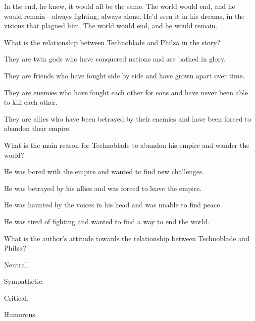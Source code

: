 \documentclass{exam-zh}
\begin{document}
In the end, he knew, it would all be the same. The world would end, and he would remain—always fighting, always alone. He'd seen it in his dreams, in the visions that plagued him. The world would end, and he would remain.

\begin{question}
  What is the relationship between Technoblade and Philza in the story?
  \begin{choices}
  \item They are twin gods who have conquered nations and are bathed in glory.
  \item They are friends who have fought side by side and have grown apart over time.
  \item They are enemies who have fought each other for eons and have never been able to kill each other.
  \item They are allies who have been betrayed by their enemies and have been forced to abandon their empire.
  \end{choices}
\end{question}

\begin{question}
  What is the main reason for Technoblade to abandon his empire and wander the world?
  \begin{choices}
  \item He was bored with the empire and wanted to find new challenges.
  \item He was betrayed by his allies and was forced to leave the empire.
  \item He was haunted by the voices in his head and was unable to find peace.
  \item He was tired of fighting and wanted to find a way to end the world.
  \end{choices}
\end{question}

\begin{question}
  What is the author's attitude towards the relationship between Technoblade and Philza?
  \begin{choices}
  \item Neutral.
  \item Sympathetic.
  \item Critical.
  \item Humorous.
  \end{choices}
\end{question}
\end{document}
